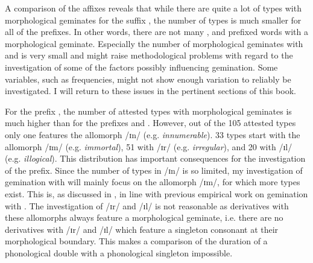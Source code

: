 A comparison of the affixes reveals that while there are quite a lot of types with morphological geminates for the suffix , the number of types is much smaller for all of the prefixes. In other words, there are not many ,  and prefixed words with a morphological geminate. Especially the number of morphological geminates with  and  is very small and might raise methodological problems with regard to the investigation of some of the factors possibly influencing gemination. Some variables, such as frequencies, might not show enough variation to reliably be investigated. I will return to these issues in the pertinent sections of this book.

For the prefix , the number of attested types with morphological geminates is much higher than for the prefixes  and . However, out of the 105 attested types only one features the allomorph /ɪn/ (e.g. \textit{innumerable}). 33 types start with the allomorph /ɪm/ (e.g. \textit{immortal}), 51 with /ɪr/ (e.g. \textit{irregular}), and 20 with /ɪl/ (e.g. \textit{illogical}). 
This distribution has important consequences for the investigation of the prefix. Since the number of types in /ɪn/ is so limited, my investigation of gemination with  will mainly focus on the allomorph /ɪm/, for which more types exist. This is, as discussed in , in line with previous empirical work on gemination with .
The investigation of /ɪr/  and /ɪl/ is not reasonable as derivatives with these allomorphs always feature a morphological geminate, i.e. there are no derivatives with /ɪr/  and /ɪl/ which feature a singleton consonant at their morphological boundary. This makes a comparison of the duration of a phonological double with a phonological singleton impossible.

